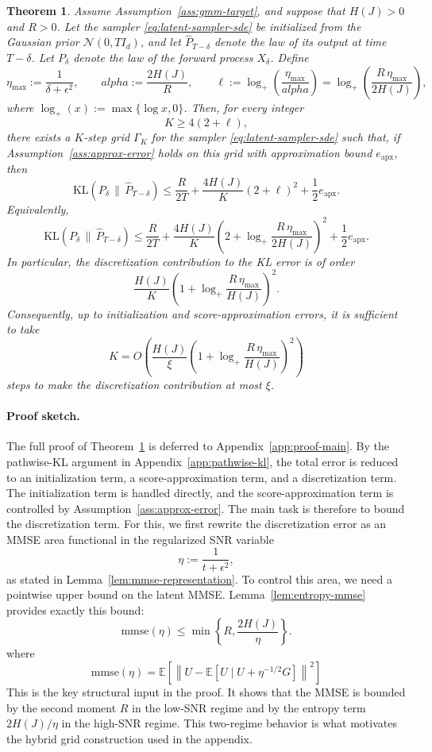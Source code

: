 \documentclass[11pt]{article}
\def\alpha{alpha}%
\newtheorem{theorem}{Theorem}
\newcommand{\E}{\mathbb{E}}
\newcommand{\KL}{\mathrm{KL}}
\newcommand{\mmse}{\mathrm{mmse}}
\newcommand{\eps}{\epsilon}
\newcommand{\norm}[1]{\left\lVert #1 \right\rVert}
\begin{document}
\begin{theorem}
\label{thm:main-sampling-bound}
Assume Assumption~\ref{ass:gmm-target}, and suppose that \(H(J)>0\) and
\(R>0\). Let the sampler \eqref{eq:latent-sampler-sde} be initialized from the
Gaussian prior \(\mathcal N(0,T I_d)\), and let
\(\widehat P_{T-\delta}\) denote the law of its output at time \(T-\delta\).
Let \(P_\delta\) denote the law of the forward process \(X_\delta\). Define
\[
    \eta_{\max}:=\frac{1}{\delta+\eps^2},
    \qquad
    \alpha:=\frac{2H(J)}{R},
    \qquad
    \ell:=\log_+\!\left(\frac{\eta_{\max}}{\alpha}\right)
    =
    \log_+\!\left(\frac{R\,\eta_{\max}}{2H(J)}\right),
\]
where \(\log_+(x):=\max\{\log x,0\}\). Then, for every integer
\[
    K\ge 4(2+\ell),
\]
there exists a \(K\)-step grid \(\Gamma_K\) for the sampler
\eqref{eq:latent-sampler-sde} such that, if
Assumption~\ref{ass:approx-error} holds on this grid with approximation bound
\(e_{\mathrm{apx}}\), then
\[
    \KL(P_\delta\,\|\,\widehat P_{T-\delta})
    \le
    \frac{R}{2T}
    +
    \frac{4H(J)}{K}
    \left(2+\ell\right)^2
    +
    \frac12 e_{\mathrm{apx}} .
\]
Equivalently,
\[
    \KL(P_\delta\,\|\,\widehat P_{T-\delta})
    \le
    \frac{R}{2T}
    +
    \frac{4H(J)}{K}
    \left(
    2+\log_+\frac{R\,\eta_{\max}}{2H(J)}
    \right)^2
    +
    \frac12 e_{\mathrm{apx}} .
\]
In particular, the discretization contribution to the KL error is of order
\[
    \frac{H(J)}{K}
    \left(
    1+\log_+\frac{R\,\eta_{\max}}{H(J)}
    \right)^2 .
\]
Consequently, up to initialization and score-approximation errors, it is
sufficient to take
\[
    K
    =
    O\!\left(
    \frac{H(J)}{\xi}
    \left(
    1+\log_+\frac{R\,\eta_{\max}}{H(J)}
    \right)^2
    \right)
\]
steps to make the discretization contribution at most \(\xi\).
\end{theorem}
\paragraph{Proof sketch.}
The full proof of Theorem~\ref{thm:main-sampling-bound} is deferred to
Appendix~\ref{app:proof-main}. By the pathwise-KL argument in
Appendix~\ref{app:pathwise-kl}, the total error is reduced to an initialization
term, a score-approximation term, and a discretization term. The initialization
term is handled directly, and the score-approximation term is controlled by
Assumption~\ref{ass:approx-error}. The main task is therefore to bound the
discretization term. For this, we first rewrite the discretization error as an
MMSE area functional in the regularized SNR variable
\[
    \eta := \frac{1}{t+\eps^2},
\]
as stated in Lemma~\ref{lem:mmse-representation}. To control this area, we need
a pointwise upper bound on the latent MMSE. Lemma~\ref{lem:entropy-mmse}
provides exactly this bound:
\[
    \mmse(\eta)\le \min\left\{R,\frac{2H(J)}{\eta}\right\}.
\]
where 
\[
    \mmse(\eta)
    =
    \E\!\left[
    \norm{
    U-\E[U\mid U+\eta^{-1/2}G]
    }^2
    \right]
\]
This is the key structural input in the proof. It shows that the MMSE is
bounded by the second moment \(R\) in the low-SNR regime and by the entropy
term \(2H(J)/\eta\) in the high-SNR regime. This two-regime behavior is what
motivates the hybrid grid construction used in the appendix.
\end{document}
